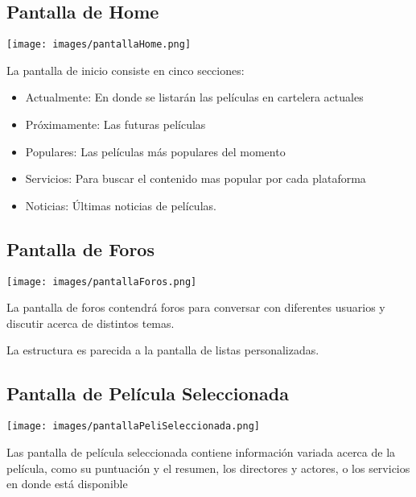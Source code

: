 \documentclass{article}
\begin{document}
\subsection{Pantalla de Home}

    \begin{minipage}{0.4\textwidth}
        \texttt{[image: images/pantallaHome.png]}
    \end{minipage}
    \hfill
    \begin{minipage}{0.55\textwidth}
    La pantalla de inicio consiste en cinco secciones:
        \begin{itemize}
            \item Actualmente: En donde se listarán las películas en cartelera actuales
            \item Próximamente: Las futuras películas 
            \item Populares: Las películas más populares del momento
            \item Servicios: Para buscar el contenido mas popular por cada plataforma
            \item Noticias: Últimas noticias de películas.
        \end{itemize}
    
    \end{minipage}

\subsection{Pantalla de Foros}

    \begin{minipage}{0.4\textwidth}
        \texttt{[image: images/pantallaForos.png]}
    \end{minipage}
    \hfill
    \begin{minipage}{0.55\textwidth}
    La pantalla de foros contendrá foros para conversar con diferentes usuarios y discutir acerca de distintos temas.
    
    La estructura es parecida a la pantalla de listas personalizadas.

    \end{minipage}

\subsection{Pantalla de Película Seleccionada}

    \begin{minipage}{0.4\textwidth}
        \texttt{[image: images/pantallaPeliSeleccionada.png]}
    \end{minipage}
    \hfill
    \begin{minipage}{0.55\textwidth}
    Las pantalla de película seleccionada contiene información variada acerca de la película, como su puntuación y el resumen, los directores y actores, o los servicios en donde está disponible
    
    \end{minipage}
\end{document}
